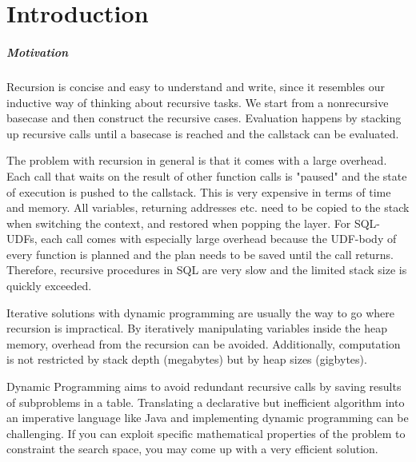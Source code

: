 \chapter{Introduction}\label{Introduction}


\paragraph*{Motivation} Recursion is concise and easy to understand and write, since it resembles our inductive way of thinking about recursive tasks. We start from a nonrecursive basecase and then construct the recursive cases. Evaluation happens by stacking up recursive calls until a basecase is reached and the callstack can be evaluated.

The problem with recursion in general is that it comes with a large overhead. Each call that waits on the result of other function calls is "paused" and the state of execution is pushed to the callstack. This is very expensive in terms of time and memory. All variables, returning addresses etc. need to be copied to the stack when switching the context, and restored when popping the layer. For SQL-UDFs, each call comes with especially large overhead because the UDF-body of every function is planned and the plan needs to be saved until the call returns. Therefore, recursive procedures in SQL are very slow and the limited stack size is quickly exceeded.

Iterative solutions with dynamic programming are usually the way to go where recursion is impractical. By iteratively manipulating variables inside the heap memory, overhead from the recursion can be avoided. Additionally, computation is not restricted by stack depth (megabytes) but by heap sizes (gigbytes).

Dynamic Programming \cite{DP_Bellman} aims to avoid redundant recursive calls by saving results of subproblems in a table. Translating a declarative but inefficient algorithm into an imperative language like Java and implementing dynamic programming can be challenging. If you can exploit specific mathematical properties of the problem to constraint the search space, you may come up with a very efficient solution.

